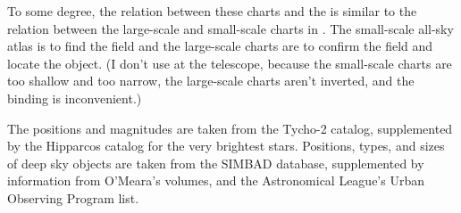 To some degree, the relation between these charts and the {\PSA} is similar to the relation between the large-scale and small-scale charts in . The small-scale all-sky atlas is to find the field and the large-scale charts are to confirm the field and locate the object. (I don’t use  at the telescope, because the small-scale charts are too shallow and too narrow, the large-scale charts aren’t inverted, and the binding is inconvenient.) 

The positions and magnitudes are taken from the Tycho-2 catalog, supplemented by the Hipparcos catalog for the very brightest stars. Positions, types, and sizes of deep sky objects are taken from the SIMBAD database, supplemented by information from O’Meara’s  volumes, and the Astronomical League’s Urban Observing Program list.
